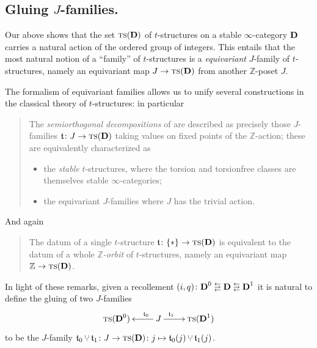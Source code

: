 \subsection{Gluing $J$\hyp{}families.}
Our  above shows that the set $ \text{\scshape ts} (\textbf{D})$ of $t$\hyp{}structures on a stable $\infty$\hyp{}category $\textbf{D}$ carries a natural action of the ordered group of integers. This entails that the most natural notion of a ``family'' of $t$\hyp{}structures is a \emph{equivariant} $J$\hyp{}family of $t$\hyp{}structures, namely an equivariant map $J\to  \text{\scshape ts} (\textbf{D})$ from another $\mathbb{Z}$\hyp{}poset $J$.

The formalism of equivariant families allows us to unify several constructions in the classical theory of $t$\hyp{}structures: in particular
\begin{quote}
The \emph{semiorthogonal decompositions} of \cite{Bondal1995, Kuz} are described as precisely those $J$\hyp{}families $\mathfrak{t}\colon J\to  \text{\scshape ts} (\textbf{D})$ taking values on fixed points of the $\mathbb{Z}$\hyp{}action; these are equivalently characterized as
\begin{itemize}
\item the \emph{stable} $t$\hyp{}structures, where the torsion and torsionfree classes are themselves stable $\infty$\hyp{}categories;
\item the equivariant $J$\hyp{}families where $J$ has the trivial action.
\end{itemize}
\end{quote}
And again
\begin{quote}
The datum of a single $t$\hyp{}structure $\mathfrak{t}\colon \{*\}\to  \text{\scshape ts} (\textbf{D})$ is equivalent to the datum of a whole \emph{$\mathbb{Z}$\hyp{}orbit} of $t$\hyp{}structures, namely an equivariant map $\mathbb{Z}\to  \text{\scshape ts} (\textbf{D})$.
\end{quote}
In light of these remarks, given a recollement $(i,q)\colon \D^0 \lrlarrows  \D \lrlarrows  \D^1$ it is natural to define the gluing of two $J$\hyp{}families 
\[
	\xymatrix{
	   \ts (\D^0)	& J	&  \ts (\D^1)
	  \ar_(.3){\tee_0} "1,2";"1,1" 
	  \ar^(.3){\tee_1} "1,2";"1,3"
	}
\]
to be the $J$\hyp{}family $\tee_0\glue\tee_1\colon J\to  \ts (\D)\colon j\mapsto \tee_0(j)\glue\tee_1(j)$.

